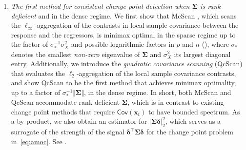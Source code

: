 \documentclass[11pt, a4paper]{article}
\newcommand{\mbf}{\mathbf}
\newcommand{\Cov}[0]{\mathsf{Cov}}
\theoremstyle{definition}
\theoremstyle{definition}
\theoremstyle{definition}
\theoremstyle{definition}
\theoremstyle{definition}
\theoremstyle{remark}
\theoremstyle{definition}
\theoremstyle{definition}
\theoremstyle{definition}
\begin{document}
\begin{enumerate}[label = (\roman*)]
\begin{table}[t!]
\end{table}

\item \emph{The first method for consistent change point detection when $\bm\Sigma$ is rank deficient} and in the dense regime.
We first show that McScan \citep{cho2024detection}, which scans the $\ell_\infty$-aggregation of the contrasts in local sample covariance between the response and the regressors, is minimax optimal in the sparse regime up to the factor of $\sigma_*^{-1}\sigma_X^2$ and possible logarithmic factors in $p$ and $n$ (), where $\sigma_*$ denotes the smallest \textit{non-zero} eigenvalue of $\bm\Sigma$ and $\sigma_X^2$ its largest diagonal entry.
Additionally, we introduce the \emph{quadratic covariance scanning} (QcScan) that evaluates the $\ell_2$-aggregation of the local sample covariance contrasts, and show QcScan to be the first method that achieves minimax optimality, up to a factor of $\sigma_*^{-1} \Vert \bm\Sigma \Vert$, in the dense regime.
In short, both McScan and QcScan accommodate rank-deficient $\bm\Sigma$, which is in contrast to existing change point methods that require $\Cov(\mbf x_t)$ to have bounded spectrum.
As a by-product, we also obtain an estimator for $\vert\bm\Sigma\bm\delta\vert_2^2$, which serves as a surrogate of the strength of the signal $\bm\delta^\top\bm\Sigma\bm\delta$ for the change point problem in~\eqref{eq:amoc}. See . 


\end{enumerate}
\end{document}
